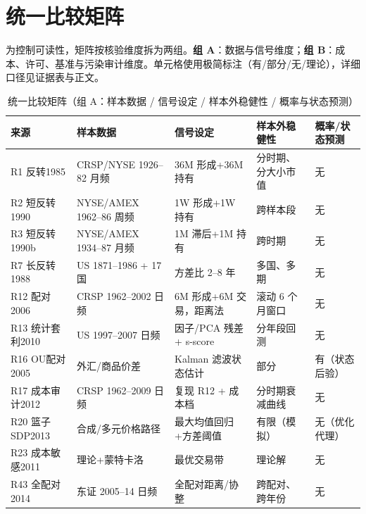 \section{统一比较矩阵}\label{sec:matrix}

为控制可读性，矩阵按核验维度拆为两组。\textbf{组 A}：数据与信号维度；\textbf{组 B}：成本、许可、基准与污染审计维度。单元格使用极简标注（有/部分/无/理论），详细口径见证据表与正文。

\begin{table}[htbp]
\centering
\caption{统一比较矩阵（组 A：样本数据 / 信号设定 / 样本外稳健性 / 概率与状态预测）}
\label{tab:matrix_a}
\footnotesize
\begin{tabular}{@{}>{\raggedright\arraybackslash}p{1.4cm}>{\raggedright\arraybackslash}p{3.4cm}>{\raggedright\arraybackslash}p{3.4cm}>{\raggedright\arraybackslash}p{2.7cm}>{\raggedright\arraybackslash}p{2.7cm}@{}}
\toprule
来源 & 样本数据 & 信号设定 & 样本外稳健性 & 概率/状态预测 \\
\midrule
R1 反转1985 & CRSP/NYSE 1926--82 月频 & 36M 形成+36M 持有 & 分时期、分大小市值 & 无 \\
R2 短反转1990 & NYSE/AMEX 1962--86 周频 & 1W 形成+1W 持有 & 跨样本段 & 无 \\
R3 短反转1990b & NYSE/AMEX 1934--87 月频 & 1M 滞后+1M 持有 & 跨时期 & 无 \\
R7 长反转1988 & US 1871--1986 + 17 国 & 方差比 2--8 年 & 多国、多期 & 无 \\
R12 配对2006 & CRSP 1962--2002 日频 & 6M 形成+6M 交易，距离法 & 滚动 6 个月窗口 & 无 \\
R13 统计套利2010 & US 1997--2007 日频 & 因子/PCA 残差 + s-score & 分年段回测 & 无 \\
R16 OU配对2005 & 外汇/商品价差 & Kalman 滤波状态估计 & 部分 & 有（状态后验） \\
R17 成本审计2012 & CRSP 1962--2009 日频 & 复现 R12 + 成本档 & 分时期衰减曲线 & 无 \\
R20 篮子SDP2013 & 合成/多元价格路径 & 最大均值回归+方差阈值 & 有限（模拟） & 无（优化代理） \\
R23 成本敏感2011 & 理论+蒙特卡洛 & 最优交易带 & 理论解 & 无 \\
R43 全配对2014 & 东证 2005--14 日频 & 全配对距离/协整 & 跨配对、跨年份 & 无 \\
\bottomrule
\end{tabular}
\end{table}

